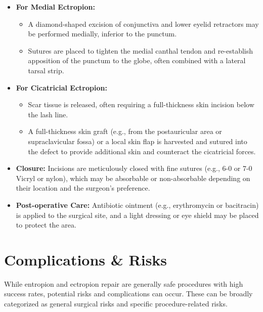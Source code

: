 \begin{itemize}
  \item \textbf{For Medial Ectropion:}
    \begin{itemize}
      \item A diamond-shaped excision of conjunctiva and lower eyelid retractors may be performed medially, inferior to the punctum.
      \item Sutures are placed to tighten the medial canthal tendon and re-establish apposition of the punctum to the globe, often combined with a lateral tarsal strip.
    \end{itemize}

  \item \textbf{For Cicatricial Ectropion:}
    \begin{itemize}
      \item Scar tissue is released, often requiring a full-thickness skin incision below the lash line.
      \item A full-thickness skin graft (e.g., from the postauricular area or supraclavicular fossa) or a local skin flap is harvested and sutured into the defect to provide additional skin and counteract the cicatricial forces.
    \end{itemize}

  \item \textbf{Closure:} Incisions are meticulously closed with fine sutures (e.g., 6-0 or 7-0 Vicryl or nylon), which may be absorbable or non-absorbable depending on their location and the surgeon's preference.

  \item \textbf{Post-operative Care:} Antibiotic ointment (e.g., erythromycin or bacitracin) is applied to the surgical site, and a light dressing or eye shield may be placed to protect the area.
\end{itemize}

\section*{Complications \& Risks}
While entropion and ectropion repair are generally safe procedures with high success rates, potential risks and complications can occur. These can be broadly categorized as general surgical risks and specific procedure-related risks.


